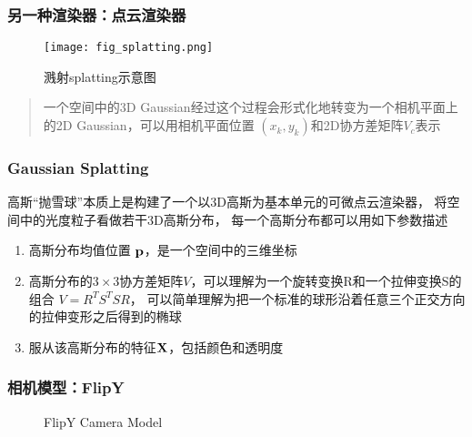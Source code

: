 \begin{frame}
    \frametitle{另一种渲染器：点云渲染器}
    \begin{figure}[H]
        \centering
        \texttt{[image: fig\_splatting.png]}
        \caption{溅射splatting示意图}
        \label{fig:tile_render}
    \end{figure}
    \begin{quote}
        一个空间中的3D Gaussian经过这个过程会形式化地转变为一个相机平面上的2D Gaussian，可以用相机平面位置 $(x_k,y_k)$和2D协方差矩阵$V_c$表示 
    \end{quote}
\end{frame}

\begin{frame}
    \frametitle{Gaussian Splatting \cite{kerbl3DGaussianSplatting2023}}
    高斯“抛雪球”本质上是构建了一个以3D高斯为基本单元的可微点云渲染器，
    将空间中的光度粒子看做若干3D高斯分布，
    每一个高斯分布都可以用如下参数描述
    \begin{enumerate}
        \item 高斯分布均值位置 $\bf{p}$，是一个空间中的三维坐标
        \item 高斯分布的$3\times 3$协方差矩阵$V$，可以理解为一个旋转变换R和一个拉伸变换S的组合 $V=R^TS^TSR$，
            可以简单理解为把一个标准的球形沿着任意三个正交方向的拉伸变形之后得到的椭球
        \item 服从该高斯分布的特征$\bf{X}$，包括颜色和透明度 
    \end{enumerate}
\end{frame}

\begin{frame}
    \frametitle{相机模型：FlipY}
    \begin{figure}[H]
        \centering
        \caption{FlipY Camera Model}
        \label{fig:flip_y_camera}
    \end{figure}
\end{frame}


